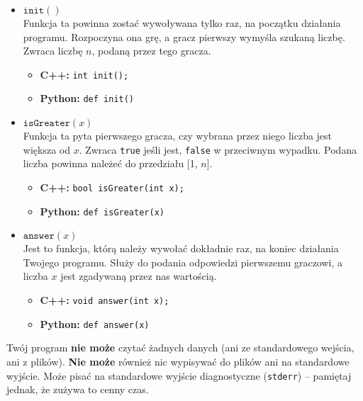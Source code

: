 \documentclass{spiral}
\begin{document}
    \begin{itemize}
        \item $\texttt{init}()$ \\
            Funkcja ta powinna zostać wywoływana
            tylko raz, na początku działania programu.
            Rozpoczyna ona grę, a gracz pierwszy wymyśla szukaną liczbę.
            Zwraca liczbę $n$, podaną przez tego gracza.
            \begin{itemize}
                \item \textbf{C++:}
		                \texttt{int init();}

                \item \textbf{Python:}
		                \texttt{def init()}
            \end{itemize}

        \item $\texttt{isGreater}(x)$ \\
            Funkcja ta pyta pierwszego gracza,
            czy wybrana przez niego liczba jest większa od $x$.
            Zwraca \texttt{true} jeśli jest, \texttt{false} w przeciwnym wypadku.
            Podana liczba powinna należeć do przedziału [1, $n$].
            \begin{itemize}
                \item \textbf{C++:}
		                \texttt{bool isGreater(int x);}

                \item \textbf{Python:}
		                \texttt{def isGreater(x)}
            \end{itemize}

        \item $\texttt{answer}(x)$ \\
            Jest to funkcja, którą należy wywołać dokładnie raz,
            na koniec działania Twojego programu.
            Służy do podania odpowiedzi pierwszemu graczowi,
            a liczba $x$ jest zgadywaną przez nas wartością.
            \begin{itemize}
                \item \textbf{C++:}
		                \texttt{void answer(int x);}
                \item \textbf{Python:}
		                \texttt{def answer(x)}
            \end{itemize}
    \end{itemize}

    Twój program \textbf{nie może} czytać żadnych danych
    (ani ze standardowego wejścia, ani z plików).
    \textbf{Nie może} również nic wypisywać do plików ani na standardowe wyjście.
    Może pisać na standardowe wyjście diagnostyczne
    (\texttt{stderr}) -- pamiętaj jednak, że zużywa to cenny czas.
\end{document}
